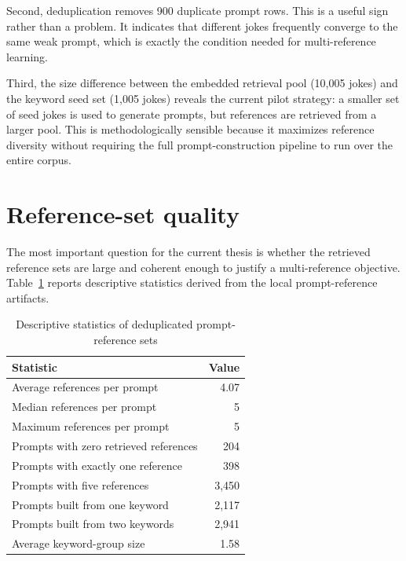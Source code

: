 \documentclass[14pt,a4paper]{extreport}
\begin{document}
Second, deduplication removes 900 duplicate prompt rows. This is a useful sign rather than a problem. It indicates that different jokes frequently converge to the same weak prompt, which is exactly the condition needed for multi-reference learning.

Third, the size difference between the embedded retrieval pool (10{,}005 jokes) and the keyword seed set (1{,}005 jokes) reveals the current pilot strategy: a smaller set of seed jokes is used to generate prompts, but references are retrieved from a larger pool. This is methodologically sensible because it maximizes reference diversity without requiring the full prompt-construction pipeline to run over the entire corpus.

\section{Reference-set quality}

The most important question for the current thesis is whether the retrieved reference sets are large and coherent enough to justify a multi-reference objective. Table~\ref{tab:refstats} reports descriptive statistics derived from the local prompt-reference artifacts.

\begin{table}[ht]
  \centering
  \caption{Descriptive statistics of deduplicated prompt-reference sets}
  \label{tab:refstats}
  \begin{tabular}{p{}r}
    \toprule
    Statistic                              & Value   \\
    \midrule
    Average references per prompt          & 4.07    \\
    Median references per prompt           & 5       \\
    Maximum references per prompt          & 5       \\
    Prompts with zero retrieved references & 204     \\
    Prompts with exactly one reference     & 398     \\
    Prompts with five references           & 3{,}450 \\
    Prompts built from one keyword         & 2{,}117 \\
    Prompts built from two keywords        & 2{,}941 \\
    Average keyword-group size             & 1.58    \\
    \bottomrule
  \end{tabular}
\end{table}
\end{document}
